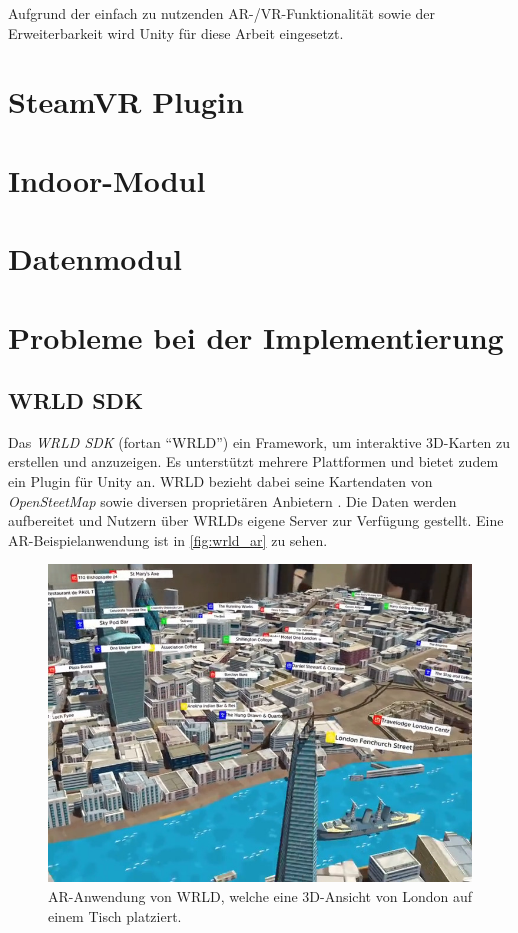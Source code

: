 Aufgrund der einfach zu nutzenden AR-/VR-Funktionalität sowie der Erweiterbarkeit wird Unity für diese Arbeit eingesetzt.

\section{SteamVR Plugin}

\section{Indoor-Modul} %

\section{Datenmodul} %

\section{Probleme bei der Implementierung}

\subsection{WRLD SDK}

Das \emph{WRLD SDK} (fortan \enquote{WRLD}) ein Framework, um interaktive 3D-Karten zu erstellen und anzuzeigen.
Es unterstützt mehrere Plattformen und bietet zudem ein Plugin für Unity an.
WRLD bezieht dabei seine Kartendaten von \emph{OpenSteetMap} sowie diversen proprietären Anbietern \parencite{WRLD2018}.
Die Daten werden aufbereitet und Nutzern über WRLDs eigene Server zur Verfügung gestellt.
Eine AR-Beispielanwendung ist in \autoref{fig:wrld_ar} zu sehen.
\begin{figure}
    \centering
    \includegraphics[width=\textwidth]{figures/wrld_ar-web-11}
    \caption{AR-Anwendung von WRLD, welche eine 3D-Ansicht von London auf einem Tisch platziert. }
    \label{fig:wrld_ar}
\end{figure}

